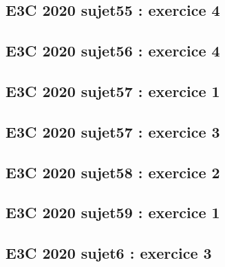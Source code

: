 \documentclass[lang=fr,edition=teacher,layout=sheet]{mxbook}
\begin{document}
\begingroup\endgroup
\par\bigskip
{}\subsection*{E3C 2020 sujet55 : exercice 4}
\begingroup\endgroup
\par\bigskip
{}\subsection*{E3C 2020 sujet56 : exercice 4}
\begingroup\endgroup
\par\bigskip
{}\subsection*{E3C 2020 sujet57 : exercice 1}
\begingroup\endgroup
\par\bigskip
{}\subsection*{E3C 2020 sujet57 : exercice 3}
\begingroup\endgroup
\par\bigskip
{}\subsection*{E3C 2020 sujet58 : exercice 2}
\begingroup\endgroup
\par\bigskip
{}\subsection*{E3C 2020 sujet59 : exercice 1}
\begingroup\endgroup
\par\bigskip
{}\subsection*{E3C 2020 sujet6 : exercice 3}
\begingroup\endgroup
\end{document}
